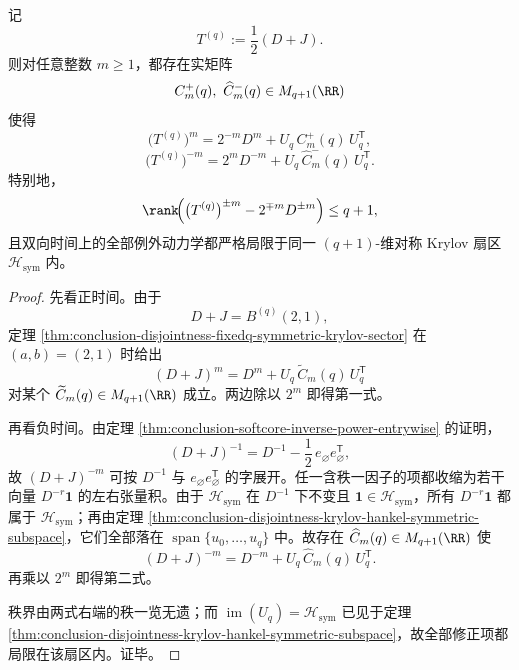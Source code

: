 \begin{theorem}\label{thm:conclusion-softcore-bi-infinite-symmetric-krylov-compression}
记
\[
T^{(q)}:=\frac12(D+J).
\]
则对任意整数 \(m\ge 1\)，都存在实矩阵
\[
C_m^{+}(q),\ \widehat C_m^{-}(q)\in M_{q+1}(\RR)
\]
使得
\[
\bigl(T^{(q)}\bigr)^m
=
2^{-m}D^m+U_q\,C_m^{+}(q)\,U_q^{\mathsf T},
\]
\[
\bigl(T^{(q)}\bigr)^{-m}
=
2^{m}D^{-m}+U_q\,\widehat C_m^{-}(q)\,U_q^{\mathsf T}.
\]
特别地，
\[
\rank\!\Bigl(\bigl(T^{(q)}\bigr)^{\pm m}-2^{\mp m}D^{\pm m}\Bigr)\le q+1,
\]
且双向时间上的全部例外动力学都严格局限于同一 \((q+1)\)-维对称 Krylov 扇区 \(\mathcal H_{\mathrm{sym}}\) 内。
\end{theorem}
\begin{proof}
先看正时间。由于
\[
D+J=B^{(q)}(2,1),
\]
定理 \ref{thm:conclusion-disjointness-fixedq-symmetric-krylov-sector} 在 \((a,b)=(2,1)\) 时给出
\[
(D+J)^m=D^m+U_q\,\widetilde C_m(q)\,U_q^{\mathsf T}
\]
对某个 \(\widetilde C_m(q)\in M_{q+1}(\RR)\) 成立。两边除以 \(2^m\) 即得第一式。

再看负时间。由定理 \ref{thm:conclusion-softcore-inverse-power-entrywise} 的证明，
\[
(D+J)^{-1}=D^{-1}-\frac12\,e_{\varnothing}e_{\varnothing}^{\mathsf T},
\]
故 \((D+J)^{-m}\) 可按 \(D^{-1}\) 与 \(e_{\varnothing}e_{\varnothing}^{\mathsf T}\) 的字展开。任一含秩一因子的项都收缩为若干向量 \(D^{-r}\mathbf 1\) 的左右张量积。由于 \(\mathcal H_{\mathrm{sym}}\) 在 \(D^{-1}\) 下不变且 \(\mathbf 1\in \mathcal H_{\mathrm{sym}}\)，所有 \(D^{-r}\mathbf 1\) 都属于 \(\mathcal H_{\mathrm{sym}}\)；再由定理 \ref{thm:conclusion-disjointness-krylov-hankel-symmetric-subspace}，它们全部落在 \(\operatorname{span}\{u_0,\dots,u_q\}\) 中。故存在 \(\widehat C_m(q)\in M_{q+1}(\RR)\) 使
\[
(D+J)^{-m}=D^{-m}+U_q\,\widehat C_m(q)\,U_q^{\mathsf T}.
\]
再乘以 \(2^m\) 即得第二式。

秩界由两式右端的秩一览无遗；而 \(\operatorname{im}(U_q)=\mathcal H_{\mathrm{sym}}\) 已见于定理 \ref{thm:conclusion-disjointness-krylov-hankel-symmetric-subspace}，故全部修正项都局限在该扇区内。证毕。
\end{proof}

